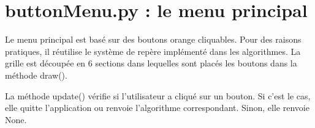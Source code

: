\documentclass{scrreprt}
\begin{document}
\section{buttonMenu.py : le menu principal}

Le menu principal est basé sur des boutons orange cliquables. Pour des raisons pratiques,
 il réutilise le système de repère implémenté dans les algorithmes. La grille est découpée
 en 6 sections dans lequelles sont placés les boutons dans la méthode draw().

La méthode update() vérifie si l'utilisateur a cliqué sur un bouton. Si c'est le cas, elle
 quitte l'application ou renvoie l'algorithme correspondant. Sinon, elle renvoie None.
\end{document}
